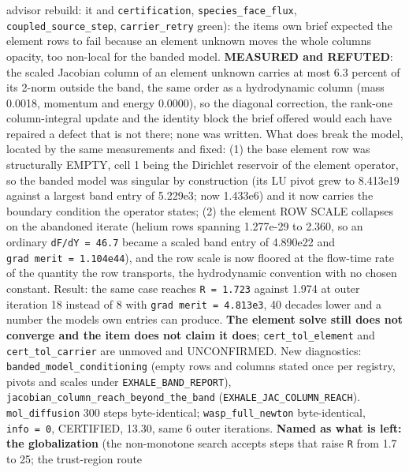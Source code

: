 \documentclass[english,a4paper]{my_memo}
\begin{document}
\begin{itemize}
  advisor rebuild: it and \texttt{certification}, \texttt{species\_face\_flux},
  \texttt{coupled\_source\_step}, \texttt{carrier\_retry} green): the item\textquotesingle s own brief
  expected the element rows to fail because an element unknown moves the
  whole column\textquotesingle s opacity, too non-local for the banded model. \textbf{MEASURED and
  REFUTED}: the scaled Jacobian column of an element unknown carries at
  most 6.3 percent of its 2-norm outside the band, the same order as a
  hydrodynamic column (mass 0.0018, momentum and energy 0.0000), so the
  diagonal correction, the rank-one column-integral update and the identity
  block the brief offered would each have repaired a defect that is not
  there; none was written. What does break the model, located by the same
  measurements and fixed: (1) the base element row was structurally EMPTY,
  cell 1 being the Dirichlet reservoir of the element operator, so the
  banded model was singular by construction (its LU pivot grew to 8.413e19
  against a largest band entry of 5.229e3; now 1.433e6) and it now carries
  the boundary condition the operator states; (2) the element ROW SCALE
  collapses on the abandoned iterate (helium rows spanning 1.277e-29 to
  2.360, so an ordinary \texttt{dF/dY\ =\ 46.7} became a scaled band entry of
  4.890e22 and \texttt{\textbar{}\textbar{}grad\ merit\textbar{}\textbar{}\ =\ 1.104e44}), and the row scale is now
  floored at the flow-time rate of the quantity the row transports, the
  hydrodynamic convention with no chosen constant. Result: the same case
  reaches \texttt{\textbar{}\textbar{}R\textbar{}\textbar{}\ =\ 1.723} against 1.974 at outer iteration 18 instead of 8
  with \texttt{\textbar{}\textbar{}grad\ merit\textbar{}\textbar{}\ =\ 4.813e3}, 40 decades lower and a number the model\textquotesingle s
  own entries can produce. \textbf{The element solve still does not converge and
  the item does not claim it does}; \texttt{cert\_tol\_element} and
  \texttt{cert\_tol\_carrier} are unmoved and UNCONFIRMED. New diagnostics:
  \texttt{banded\_model\_conditioning} (empty rows and columns stated once per
  registry, pivots and scales under \texttt{EXHALE\_BAND\_REPORT}),
  \texttt{jacobian\_column\_reach\_beyond\_the\_band} (\texttt{EXHALE\_JAC\_COLUMN\_REACH}).
  \texttt{mol\_diffusion} 300 steps byte-identical; \texttt{wasp\_full\_newton}
  byte-identical, \texttt{info\ =\ 0}, CERTIFIED, 13.30, same 6 outer iterations.
  \textbf{Named as what is left: the globalization} (the non-monotone search
  accepts steps that raise \texttt{\textbar{}\textbar{}R\textbar{}\textbar{}} from 1.7 to 25; the trust-region route

\end{itemize}
\end{document}
